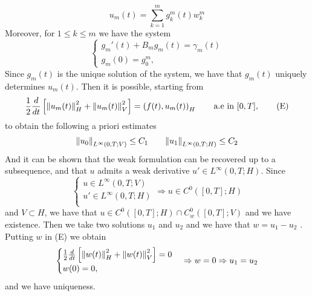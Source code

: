 \begin{enumerate}
    \[
        u_m(t) = \sum_{k=1}^m g_k^m(t) w_k^m
    \]
    Moreover, for \(1 \leq k \leq m\) we have the system
    \[
        \begin{cases}
            g_m'(t) + B_m g_m(t) = \gamma_m(t) \\
            g_m(0) = g_0^m, 
        \end{cases}
    \]
    Since \(g_m(t)\) is the unique solution of the system, we have that \(g_m(t)\) uniquely determines \(u_m(t)\). Then it is possible, starting from 
    \[
        \frac{1}{2}\frac{d}{dt} \left[\norm{u_m(t)}_H^2 + \norm{u_m(t)}_V^2\right] = \left(f(t), u_m(t)\right)_H \qquad \text{a.e in } [0, T],
        \tag*{(E)}
    \]
    to obtain the following a priori estimates
    \[
        \norm{u_0}_{L^\infty(0, T; V)} \leq C_1 \qquad \norm{u_1}_{L^\infty(0, T; H)} \leq C_2
    \]
    And it can be shown that the weak formulation can be recovered up to a subsequence, and that \(u\) admits a weak derivative \(u' \in L^\infty(0, T; H)\).
    Since 
    \[
    \begin{cases}
        u \in L^\infty(0, T; V) \\
        u' \in L^\infty(0, T; H) \\
    \end{cases}
    \Rightarrow u \in C^0([0, T]; H) 
    \]
    and \(V \subset H\), we have that \(u \in C^0([0, T]; H) \cap C_w^0([0, T]; V)\) and we have existence.
    Then we take two solutions \(u_1\) and \(u_2\) and we have that \(w = u_1 - u_2\) . Putting \(w\) in (E) we obtain
    \[
        \begin{cases}
            \frac{1}{2}\frac{d}{dt} \left[\norm{w(t)}_H^2 + \norm{w(t)}_V^2\right] = 0 \\
            w(0) = 0,
        \end{cases} 
        \Rightarrow w = 0 \Rightarrow u_1 = u_2
    \]
    and we have uniqueness.
\end{enumerate}

